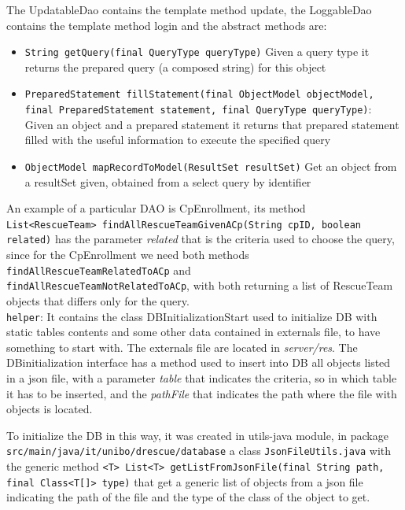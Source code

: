 \documentclass[a4paper,12pt]{report}
\begin{document}
The UpdatableDao contains the template method update, the LoggableDao contains the template method login and the abstract methods are:
\begin{itemize}
\item \texttt{String getQuery(final QueryType queryType)} Given a query type it returns the prepared query (a composed string) for this object
\item \texttt{PreparedStatement fillStatement(final ObjectModel objectModel, \\final PreparedStatement statement, final QueryType queryType)}: Given an object and a prepared statement it returns that prepared statement filled with the useful information to execute the specified query
\item \texttt{ObjectModel mapRecordToModel(ResultSet resultSet)} Get an object from a resultSet given, obtained from a select query by identifier
\end{itemize}

An example of a particular DAO is CpEnrollment, its method \\
\texttt{List<RescueTeam> findAllRescueTeamGivenACp(String cpID, boolean related)} has the parameter \textit{related} that is the criteria used to choose the query, since for the CpEnrollment we need both methods \texttt{findAllRescueTeamRelatedToACp} and \\
\texttt{findAllRescueTeamNotRelatedToACp}, with both returning a list of RescueTeam objects that differs only for the query. \\

\texttt{helper}: It contains the class DBInitializationStart used to initialize DB with static tables contents and some other data contained in externals file, to have something to start with.
The externals file are located in \textit{server/res}. The DBinitialization interface has a method used to insert into DB all objects listed in a json file, with a parameter \textit{table} that indicates the criteria, so in which table it has to be inserted, and the \textit{pathFile} that indicates the path where the file with objects is located.

To initialize the DB in this way, it was created in utils-java module, in package \texttt{src/main/java/it/unibo/drescue/database} a class \texttt{JsonFileUtils.java} with the generic method \texttt{<T> List<T> getListFromJsonFile(final String path, \\final Class<T[]> type)} that get a generic list of objects from a json file indicating the path of the file and the type of the class of the object to get.
\end{document}
